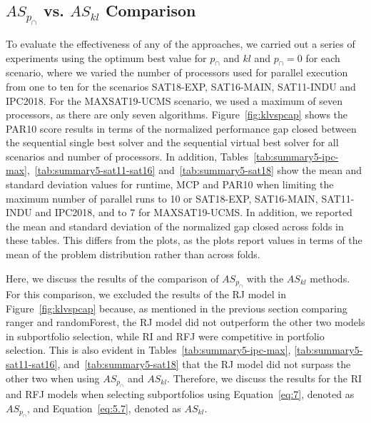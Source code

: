 \subsection{$AS_{p_{\cap}}$ vs. $AS_{kl}$ Comparison}

To evaluate the effectiveness of any of the approaches, we carried out a series of experiments using the optimum best value for $p_{\cap}$ and $kl$ and $p_{\cap} = 0$ for each scenario, where we varied the number of processors used for parallel execution from one to ten for the scenarios SAT18-EXP, SAT16-MAIN, SAT11-INDU and IPC2018. For the MAXSAT19-UCMS scenario, we used a maximum of seven processors, as there are only seven algorithms. Figure~\ref{fig:klvspcap} shows the PAR10 score results in terms of the normalized performance gap closed between the sequential single best solver and the sequential virtual best solver for all scenarios and number of processors. In addition, Tables~\ref{tab:summary5-ipc-max},~\ref{tab:summary5-sat11-sat16} and~\ref{tab:summary5-sat18} show the mean and standard deviation values for runtime, MCP and PAR10 when limiting the maximum number of parallel runs to 10 or SAT18-EXP, SAT16-MAIN, SAT11-INDU and IPC2018, and to 7 for MAXSAT19-UCMS. In addition, we reported the mean and standard deviation of the normalized gap closed across folds in these tables. This differs from the plots, as the plots report values in terms of the mean of the problem distribution rather than across folds.

Here, we discuss the results of the comparison of $AS_{p_{\cap}}$ with the $AS_{kl}$ methods. For this comparison, we excluded the results of the RJ model in Figure~\ref{fig:klvspcap} because, as mentioned in the previous section comparing ranger and randomForest, the RJ model did not outperform the other two models in subportfolio selection, while RI and RFJ were competitive in portfolio selection. This is also evident in Tables~\ref{tab:summary5-ipc-max}, \ref{tab:summary5-sat11-sat16}, and~\ref{tab:summary5-sat18} that the RJ model did not surpass the other two when using $AS_{p_{\cap}}$ and $AS_{kl}$. Therefore, we discuss the results for the RI and RFJ models when selecting subportfolios using Equation~\ref{eq:7}, denoted as $AS_{p_{\cap}}$, and Equation~\ref{eq:5.7}, denoted as $AS_{kl}$.

